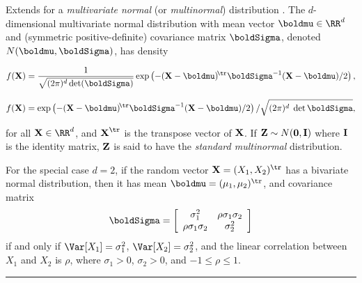 
Extends  for a
\emph{multivariate normal} (or {\em multinormal\/}) distribution \cite{tJOH72a}.
The $d$-dimensional multivariate normal distribution
with mean vector $\boldmu\in\RR^d$ and (symmetric positive-definite)
covariance matrix $\boldSigma$, denoted $N(\boldmu, \boldSigma)$, has density
\begin{latexonly}
\[
  f(\bX)=\frac1{\sqrt{(2\pi)^d\det(\boldSigma)}}
    \exp\left(-(\bX - \boldmu)^{\!\tr}\boldSigma^{-1}(\bX -
  \boldmu)/2\right),
\]
\end{latexonly}
\begin{htmlonly}
\[
  f(\bX)=
    \exp\left(-(\bX - \boldmu)^{\!\tr}\boldSigma^{-1}(\bX -
  \boldmu)/2\right) / \sqrt{(2\pi)^d\;\det{\boldSigma}},
\]
\end{htmlonly}
for all $\bX\in\RR^d$, and  $\bX^{\tr}$ is the transpose vector of $\textbf{X}$.
If $\textbf{Z} \sim N(\textbf{0}, \textbf{I})$ where $\textbf{I}$ is the
identity matrix, $\textbf{Z}$ is said to have the {\em standard multinormal\/}
 distribution.

For the special case $d=2$, if the random vector $\bX = (X_1, X_2)^\tr$
has a bivariate normal distribution, then it has mean
$\boldmu = (\mu_1, \mu_2)^\tr$, and covariance matrix
\[
\boldSigma =
\left[\begin{array}{cc}
\sigma_1^2 & \rho\sigma_1\sigma_2 \\
\rho\sigma_1\sigma_2 &\sigma_2^2
\end{array}\right]
\]
if and only if $\Var[X_1] = \sigma_1^2$, $\Var[X_2] = \sigma_2^2$, and the
linear correlation between $X_1$ and $X_2$ is $\rho$, where $\sigma_1 > 0$,
 $\sigma_2 > 0$, and $-1 \le \rho \le 1$.



\bigskip\hrule

